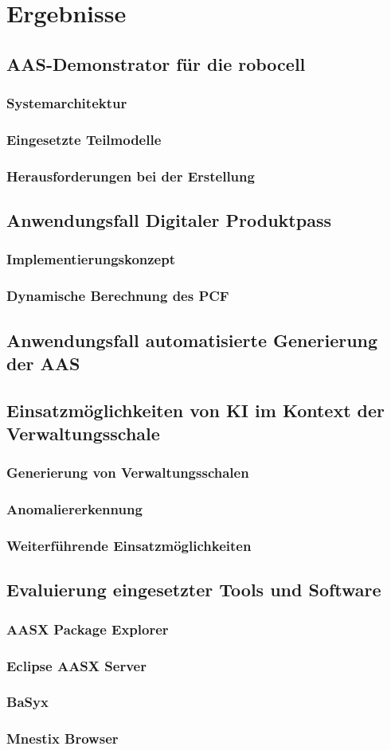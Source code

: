 \section{Ergebnisse}
\subsection{AAS-Demonstrator für die robocell}
\subsubsection{Systemarchitektur}
\subsubsection{Eingesetzte Teilmodelle}
\subsubsection{Herausforderungen bei der Erstellung}
\subsection{Anwendungsfall Digitaler Produktpass}
\subsubsection{Implementierungskonzept}
\subsubsection{Dynamische Berechnung des PCF}
\subsection{Anwendungsfall automatisierte Generierung der AAS}
\subsection{Einsatzmöglichkeiten von KI im Kontext der Verwaltungsschale}
\subsubsection{Generierung von Verwaltungsschalen}
\subsubsection{Anomaliererkennung}
\subsubsection{Weiterführende Einsatzmöglichkeiten}
\subsection{Evaluierung eingesetzter Tools und Software}
\subsubsection{AASX Package Explorer}
\subsubsection{Eclipse AASX Server}
\subsubsection{BaSyx}
\subsubsection{Mnestix Browser}